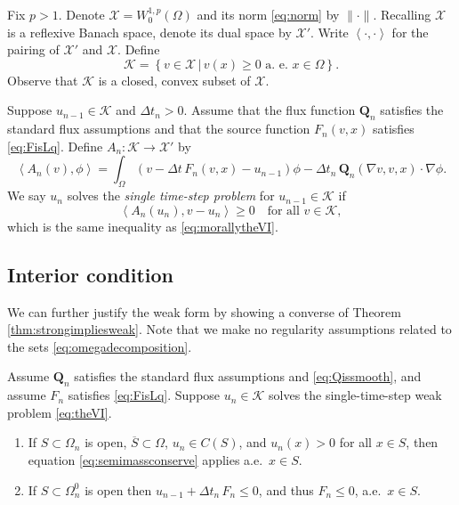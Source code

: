 \documentclass[final,leqno,onefignum,onetabnum]{siamltex1213bueler}
\newcommand\bQ{\mathbf{Q}}
\renewcommand{\grad}{\nabla}
\newcommand{\ip}[2]{\ensuremath{\left<#1,#2\right>}}
\begin{document}
\medskip
\begin{definition}  \label{def:spaces}  Fix $p>1$.  Denote $\mathcal{X} = W_0^{1,p}(\Omega)$ and its norm \eqref{eq:norm} by $\|\cdot\|$.  Recalling $\mathcal{X}$ is a reflexive Banach space, denote its dual space by $\mathcal{X}'$.  Write $\ip{\cdot}{\cdot}$ for the pairing of $\mathcal{X}'$ and $\mathcal{X}$.  Define
    $$\mathcal{K} = \left\{v \in \mathcal{X} \,\big|\, v(x) \ge 0 \text{ a.~e.~} x \in \Omega\right\}.$$
Observe that $\mathcal{K}$ is a closed, convex subset of $\mathcal{X}$.
\end{definition}

\medskip
\begin{definition}  Suppose $u_{n-1}\in\mathcal{K}$ and $\Delta t_n>0$.  Assume that the flux function $\bQ_n$ satisfies the standard flux assumptions and that the source function $F_n(v,x)$ satisfies \eqref{eq:FisLq}.  Define $A_n:\mathcal{K} \to \mathcal{X}'$ by
\begin{equation}
  \ip{A_n(v)}{\phi} = \int_\Omega \left(v - \Delta t\, F_n(v,x) - u_{n-1}\right)\phi - \Delta t_n\, \bQ_n(\grad v,v,x) \cdot \grad\phi. \label{eq:defineAn}
\end{equation}
We say $u_n$ solves the \emph{single time-step problem} for $u_{n-1}\in\mathcal{K}$ if
\begin{equation}
  \ip{A_n(u_n)}{v-u_n} \ge 0 \quad \text{for all } v \in \mathcal{K},  \label{eq:theVI}
\end{equation}
which is the same inequality as \eqref{eq:morallytheVI}.
\end{definition}

\subsection{Interior condition}  \label{subsec:interior}  We can further justify the weak form by showing a converse of Theorem \ref{thm:strongimpliesweak}.  Note that we make no regularity assumptions related to the sets \eqref{eq:omegadecomposition}.

\medskip
\begin{theorem} \label{thm:weakimpliesstrong}  Assume $\bQ_n$ satisfies the standard flux assumptions and \eqref{eq:Qissmooth}, and assume $F_n$ satisfies \eqref{eq:FisLq}.  Suppose $u_n\in\mathcal{K}$ solves the single-time-step weak problem \eqref{eq:theVI}.
\renewcommand{\labelenumi}{\emph{(\roman{enumi})}}
\begin{enumerate}
\item If $S \subset \Omega_n$ is open, $\overline{S}\subset \Omega$, $u_n\in C(S)$, and $u_n(x)>0$ for all $x\in S$, then equation \eqref{eq:semimassconserve} applies a.e.~$x\in S$.
\item If $S \subset \Omega_n^0$ is open then $u_{n-1} + \Delta t_n\,F_n \le 0$, and thus $F_n \le 0$, a.e.~$x\in S$.
\end{enumerate}
\end{theorem}
\end{document}
